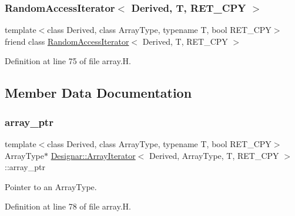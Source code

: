 \subsubsection{\texorpdfstring{Random\+Access\+Iterator$<$ Derived, T, R\+E\+T\+\_\+\+C\+P\+Y $>$}{RandomAccessIterator< Derived, T, RET\_CPY >}}
{\footnotesize\ttfamily template$<$class Derived, class Array\+Type, typename T, bool R\+E\+T\+\_\+\+C\+PY$>$ \\
friend class \hyperlink{class_designar_1_1_random_access_iterator}{Random\+Access\+Iterator}$<$ Derived, T, R\+E\+T\+\_\+\+C\+PY $>$\hspace{0.3cm}{\ttfamily [friend]}}



Definition at line 75 of file array.\+H.



\subsection{Member Data Documentation}
\mbox{\label{class_designar_1_1_array_iterator_a6518c265f47bf58f4e2c04b55416ded6}} 
\subsubsection{\texorpdfstring{array\+\_\+ptr}{array\_ptr}}
{\footnotesize\ttfamily template$<$class Derived, class Array\+Type, typename T, bool R\+E\+T\+\_\+\+C\+PY$>$ \\
Array\+Type$\ast$ \hyperlink{class_designar_1_1_array_iterator}{Designar\+::\+Array\+Iterator}$<$ Derived, Array\+Type, T, R\+E\+T\+\_\+\+C\+PY $>$\+::array\+\_\+ptr\hspace{0.3cm}{\ttfamily [protected]}}



Pointer to an Array\+Type. 



Definition at line 78 of file array.\+H.

\mbox{\label{class_designar_1_1_array_iterator_aef9cd548a0423017eb452081f260a840}} 
